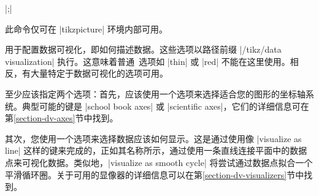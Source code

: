 \begin{command}{\datavisualization{}|;|} %

    此命令仅可在 |{tikzpicture}| 环境内部可用。

    
     用于配置数据可视化，即如何描述数据。这些选项以路径前缀 |/tikz/data visualization| 执行。这意味着普通\tikzname\ 选项如 |thin| 或 |red| 不能在这里使用。相反，有大量特定于数据可视化的选项可用。


    至少应该指定两个选项：首先，应该使用一个选项来选择适合您的图形的坐标轴系统。典型可能的键是 |school book axes| 或 |scientific axes|，它们的详细信息可在第\ref{section-dv-axes}节中找到。


    其次，您使用一个选项来选择数据应该如何显示。这是通过使用像 |visualize as line| 这样的键来完成的，正如其名称所示，通过使用一条直线连接平面中的数据点来可视化数据。类似地，|visualize as smooth cycle| 将尝试通过数据点拟合一个平滑循环圈。关于可用的显像器的详细信息可以在第\ref{section-dv-visualizers}节中找到。



\end{command}
